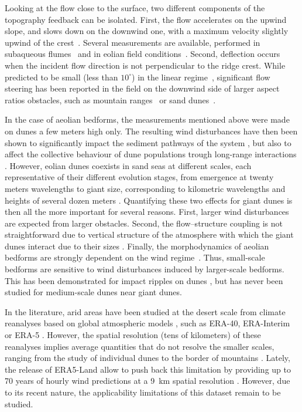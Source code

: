 Looking at the flow close to the surface, two different components of the topography feedback can be isolated. First, the flow accelerates on the upwind slope, and slows down on the downwind one, with a maximum velocity slightly upwind of the crest~\citep{Jackson1975, Sykes1980, Hunt1988}. Several measurements are available, performed in subaqueous flumes~\citep{Zilker1977, Zilker1979, Frederick1988} and in eolian field conditions~\citep{Claudin2013, Lu2021}. Second, deflection occurs when the incident flow direction is not perpendicular to the ridge crest. While predicted to be small (less than $10^{\circ}$) in the linear regime~\citep{Gadal2019}, significant flow steering has been reported in the field on the downwind side of larger aspect ratios obstacles, such as mountain ranges~\citep{Kim2000, Lewis2008, Fernando2019} or sand dunes~\citep{Walker2009, Walker2013, Hesp2015, Smith2017}.

In the case of aeolian bedforms, the measurements mentioned above were made on dunes a few meters high only. The resulting wind disturbances have then been shown to significantly impact the sediment pathways of the system \citep{Hesp2015}, but also to affect the collective behaviour of dune populations trough long-range interactions \citep{Bacik2020}.
%
However, eolian dunes coexists in sand seas at different scales, each representative of their different evolution stages, from emergence at twenty meters wavelengths to giant size, corresponding to kilometric wavelengths and heights of several dozen meters \citep{McKee1979}. Quantifying these two effects for giant dunes is then all the more important for several reasons.
%
First, larger wind disturbances are expected from larger obstacles.
%
Second, the flow--structure coupling is not straightforward due to vertical structure of the atmosphere with which the giant dunes interact due to their sizes \citep{andreotti2009}.
%
Finally, the morphodynamics of aeolian bedforms are strongly dependent on the wind regime~\citep{Livingstone1996}. Thus, small-scale bedforms are sensitive to wind disturbances induced by larger-scale bedforms. This has been demonstrated for impact ripples on dunes \citep{Howard1977,Hood2021}, but has never been studied for medium-scale dunes near giant dunes.

In the literature, arid areas have been studied at the desert scale from climate reanalyses based on global atmospheric models \citep{Blumberg1996, Livingstone2010, Ashkenazy2012, Jolivet2021, Hu2021}, such as ERA-40, ERA-Interim or ERA-5 \citep{Uppala2005, Dee2011, Hersbach2020}. However, the spatial resolution (tens of kilometers) of these reanalyses implies average quantities that do not resolve the smaller scales, ranging from the study of individual dunes to the border of mountains \citep{Livingstone2010}. Lately, the release of ERA5-Land allow to push back this limitation by providing up to 70 years of hourly wind predictions at a 9~km spatial resolution \citep{munoz2021}. However, due to its recent nature, the applicability limitations of this dataset remain to be studied.

